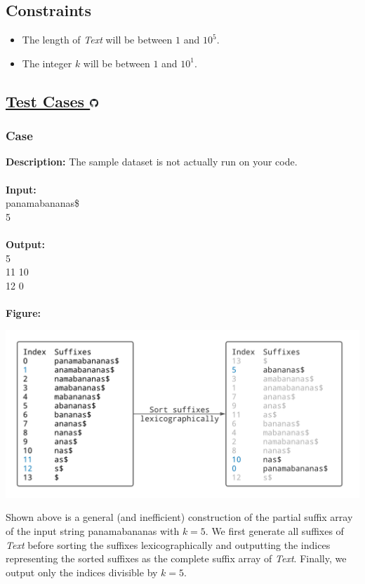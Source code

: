 \documentclass{article}
\newcommand{\code}[1]{{\fontfamily{pcr}\selectfont #1}}
\newcommand{\gitlogo}{\includegraphics[height=12.5]{c0/gitlogo.png}}
\begin{document}
\subsection*{Constraints}
\begin{itemize}
    \item The length of \emph{Text} will be between $1$ and $10^5$.
    \item The integer $k$ will be between $1$ and $10^1$.
\end{itemize}
\pagebreak

\subsection*{\href{https://github.com/rjeveloff/BA_problemregister/tree/main/test_cases/chapter_9/9Q}{Test Cases \gitlogo}}
\subsubsection*{Case }
\hline \vspace{5}
\textbf{Description:} The sample dataset is not actually run on your code.\\ \\
\noindent \textbf{Input:}\\
\code{panamabananas\$\\ 5}\\ \\
\noindent \textbf{Output:}\\
\code{1 5\\ 11 10\\ 12 0}\\ \\
\noindent \textbf{Figure:}
\begin{center}
    \includegraphics[scale=0.16]{c9/figures/9Q.png}
\end{center}
\noindent Shown above is a general (and inefficient) construction of the partial suffix array of the input string \code{panamabananas} with $k=5$. We first generate all suffixes of \emph{Text} before sorting the suffixes lexicographically and outputting the indices representing the sorted suffixes as the complete suffix array of \emph{Text}. Finally, we output only the indices divisible by $k=5$.
\pagebreak
\end{document}
